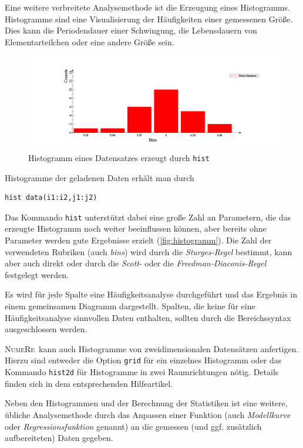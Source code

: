 \documentclass[DIV=14,headsepline,footsepline]{scrbook}
\newcommand{\NR}{\textsc{Nu\-me\-Re}}
\begin{document}
				Eine weitere verbreitete Analysemethode ist die Erzeugung eines Histogramms. Histogramme sind eine Visualisierung der Häufigkeiten einer gemessenen Größe. Dies kann die Periodendauer einer Schwingung, die Lebensdauern von Elementarteilchen oder eine andere Größe sein.
				\begin{figure}[htb]%
					\centering
					\includegraphics[width=\textwidth]{_graphics/histogramm.png}
					\caption{Histogramm eines Datensatzes erzeugt durch \lstinline{hist}}
					\label{fig:histogramm}
				\end{figure}
				
				Histogramme der geladenen Daten erhält man durch 
				\begin{lstlisting}
hist data(i1:i2,j1:j2)
				\end{lstlisting}
				Das Kommando \lstinline+hist+ unterstützt dabei eine große Zahl an Parametern, die das erzeugte Histogramm noch weiter beeinflussen können, aber bereits ohne Parameter werden gute Ergebnisse erzielt (\autoref{fig:histogramm}). Die Zahl der verwendeten Rubriken (auch \emph{bins}) wird durch die \emph{Sturges-Regel} bestimmt, kann aber auch direkt oder durch die \emph{Scott}- oder die \emph{Freedman-Diaconis-Regel} festgelegt werden.
				
				Es wird für jede Spalte eine Häufigkeitsanalyse durchgeführt und das Ergebnis in einem gemeinsamen Diagramm dargestellt. Spalten, die keine für eine Häufigkeitsanalyse sinnvollen Daten enthalten, sollten durch die Bereichssyntax ausgeschlossen werden.
				
				\NR\ kann auch Histogramme von zweidimensionalen Datensätzen anfertigen. Hierzu sind entweder die Option \lstinline+grid+ für ein einzelnes Histogramm oder das Kommando \lstinline+hist2d+ für Histogramme in zwei Raumrichtungen nötig. Details finden sich in dem entsprechenden Hilfeartikel.
				
				Neben den Histogrammen und der Berechnung der Statistiken ist eine weitere, übliche Analysemethode durch das Anpassen einer Funktion (auch \emph{Modellkurve} oder \emph{Regressionsfunktion} genannt) an die gemessen (und ggf. zusätzlich aufbereiteten) Daten gegeben.
				
\end{document}
